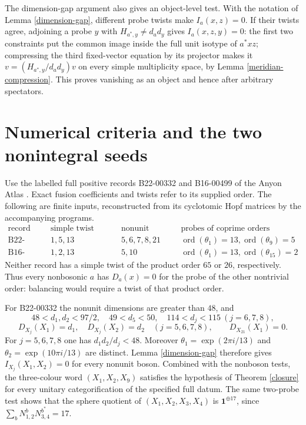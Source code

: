 \documentclass[10pt]{amsart}
\newcommand{\one}{\mathbf1}\newcommand{\C}{\mathcal C}
\begin{document}
The dimension-gap argument also gives an object-level test.
With the notation of Lemma \ref{dimension-gap}, different probe
twists make $I_a(x,z)=0$. If their twists agree, adjoining
a probe $y$ with $H_{a^*,y}\ne d_a d_y$ gives
$I_a(x,z,y)=0$: the first two constraints put the common
image inside the full unit isotype of $a^*xz$; compressing
the third fixed-vector equation by its projector makes
it $v=(H_{a^*,y}/d_a d_y)v$ on every simple multiplicity
space, by Lemma \ref{meridian-compression}. This proves
vanishing as an object and hence after arbitrary spectators.


\section{Numerical criteria and the two nonintegral seeds}\label{sec:seeds}
Use the labelled full positive records B22-00332 and
B16-00499 of the Anyon Atlas \cite{Atlas}. Exact fusion
coefficients and twists refer to its supplied order.
The following are finite inputs, reconstructed from its
cyclotomic Hopf matrices by the accompanying programs.
\[
\begin{array}{c|c|c|c}
\text{record}&\text{simple twist orders}&\text{nonunit bosons}
                           &\text{probes of coprime orders}\\\hline
\text{B22-00332}&1,5,13&5,6,7,8,21&\operatorname{ord}(\theta_1)=13,
                                      \operatorname{ord}(\theta_9)=5\\
\text{B16-00499}&1,2,13&5,10&\operatorname{ord}(\theta_1)=13,
                                      \operatorname{ord}(\theta_{15})=2
\end{array}
\]
Neither record has a simple twist of the product order
$65$ or $26$, respectively. Thus every nonbosonic $a$
has $D_a(x)=0$ for the probe of the other nontrivial
order: balancing would require a twist of that product order.

For B22-00332 the nonunit dimensions are greater than $48$,
and
\[
 48<d_1,d_2<97/2,\quad 49<d_5<50,\quad
 114<d_j<115\ (j=6,7,8),
\]
\[
 D_{X_j}(X_1)=d_1,\quad D_{X_j}(X_2)=d_2\quad(j=5,6,7,8),
 \qquad D_{X_{21}}(X_1)=0.
\]
For $j=5,6,7,8$ one has $d_1d_2/d_j<48$.
Moreover $\theta_1=\exp(2\pi i/13)$ and
$\theta_2=\exp(10\pi i/13)$ are distinct. Lemma
\ref{dimension-gap} therefore gives $I_{X_j}(X_1,X_2)=0$
for every nonunit boson. Combined with the nonboson
tests, the three-colour word $(X_1,X_2,X_9)$ satisfies
the hypothesis of Theorem \ref{closure} for every unitary
categorification of the specified full datum.
The same two-probe test shows that the sphere quotient of
$(X_1,X_2,X_3,X_4)$ is $\one^{\oplus17}$, since
$\sum_bN_{1,2}^bN_{3,4}^{b^*}=17$.
\end{document}
